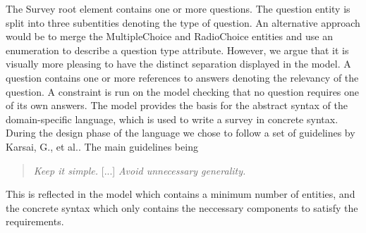 \documentclass[runningheads]{llncs}
\begin{document}
The Survey root element contains one or more questions. The question entity is split into three subentities denoting the type of question. An alternative approach would be to merge the MultipleChoice and RadioChoice entities and use an enumeration to describe a question type attribute. However, we argue that it is visually more pleasing to have the distinct separation displayed in the model. A question contains one or more references to answers denoting the relevancy of the question. A constraint is run on the model checking that no question requires one of its own answers. The model provides the basis for the abstract syntax of the domain-specific language, which is used to write a survey in concrete syntax. During the design phase of the language we chose to follow a set of guidelines by Karsai, G., et al.\cite{karsai}. The main guidelines being 
\begin{quotation}
\emph{Keep it simple.} [...] \emph{Avoid unnecessary generality.}
\end{quotation}
This is reflected in the model which contains a minimum number of entities, and the concrete syntax which only contains the neccessary components to satisfy the requirements.
\medskip
\end{document}
